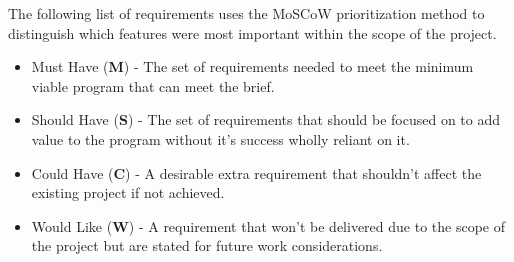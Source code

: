 \documentclass{l4proj}
\begin{document}
The following list of requirements uses the MoSCoW prioritization method to distinguish which features were most important within the scope of the project. 
\begin{itemize}
    \item Must Have (\textbf{M}) - The set of requirements needed to meet the minimum viable program that can meet the brief.
    \item Should Have (\textbf{S}) - The set of requirements that should be focused on to add value to the program without it's success wholly reliant on it.
    \item Could Have (\textbf{C}) - A desirable extra requirement that shouldn't affect the existing project if not achieved.
    \item Would Like (\textbf{W}) - A requirement that won't be delivered due to the scope of the project but are stated for future work considerations.
\end{itemize}
\end{document}
